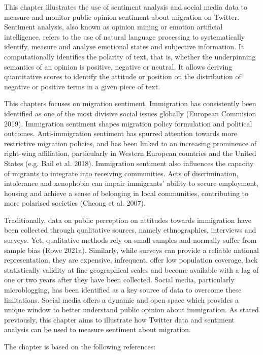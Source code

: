 \documentclass[
  letterpaper,
  DIV=11,
  numbers=noendperiod]{scrreprt}
\begin{document}
This chapter illustrates the use of sentiment analysis and social media
data to measure and monitor public opinion sentiment about migration on
Twitter. Sentiment analysis, also known as opinion mining or emotion
artificial intelligence, refers to the use of natural language
processing to systematically identify, measure and analyse emotional
states and subjective information. It computationally identifies the
polarity of text, that is, whether the underpinning semantics of an
opinion is positive, negative or neutral. It allows deriving
quantitative scores to identify the attitude or position on the
distribution of negative or positive terms in a given piece of text.

This chapters focuses on migration sentiment. Immigration has
consistently been identified as one of the most divisive social issues
globally (European Commision 2019). Immigration sentiment shapes
migration policy formulation and political outcomes. Anti-immigration
sentiment has spurred attention towards more restrictive migration
policies, and has been linked to an increasing prominence of right-wing
affiliation, particularly in Western European countries and the United
States (e.g. Bail et al. 2018). Immigration sentiment also influences
the capacity of migrants to integrate into receiving communities. Acts
of discrimination, intolerance and xenophobia can impair immigrants'
ability to secure employment, housing and achieve a sense of belonging
in local communities, contributing to more polarised societies (Cheong
et al. 2007).

Traditionally, data on public perception on attitudes towards
immigration have been collected through qualitative sources, namely
ethnographies, interviews and surveys. Yet, qualitative methods rely on
small samples and normally suffer from sample bias (Rowe 2021a).
Similarly, while surveys can provide a reliable national representation,
they are expensive, infrequent, offer low population coverage, lack
statistically validity at fine geographical scales and become available
with a lag of one or two years after they have been collected. Social
media, particularly microblogging, has been identified as a key source
of data to overcome these limitations. Social media offers a dynamic and
open space which provides a unique window to better understand public
opinion about immigration. As stated previously, this chapter aims to
illustrate how Twitter data and sentiment analysis can be used to
measure sentiment about migration.

The chapter is based on the following references:
\end{document}
